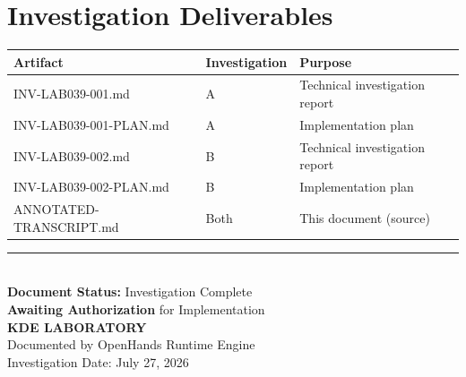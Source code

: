 \documentclass[
    11pt,
    a4paper,
    oneside,
    parskip=full,
    headings=big,
    bibliography=totoc
]{scrartcl}
\begin{document}
\section{Investigation Deliverables}

\begingroup
\addtolength{\tabcolsep}{4pt}
\begin{tabular}{llp{7cm}}
    \toprule
    \textbf{Artifact} & \textbf{Investigation} & \textbf{Purpose} \\
    \midrule
    INV-LAB039-001.md & A & Technical investigation report \\
    INV-LAB039-001-PLAN.md & A & Implementation plan \\
    INV-LAB039-002.md & B & Technical investigation report \\
    INV-LAB039-002-PLAN.md & B & Implementation plan \\
    ANNOTATED-TRANSCRIPT.md & Both & This document (source) \\
    \bottomrule
\end{tabular}
\endgroup

\vfill
\begin{center}
\color{black50}\rule{5cm}{0.5pt} \\
\textbf{Document Status:} Investigation Complete \\
\textbf{Awaiting Authorization} for Implementation \\
\vspace{0.5cm}
{\LARGE\textbf{KDE LABORATORY}} \\
\color{black50}\small Documented by OpenHands Runtime Engine \\
\color{black50}\small Investigation Date: July 27, 2026
\end{center}
\end{document}
